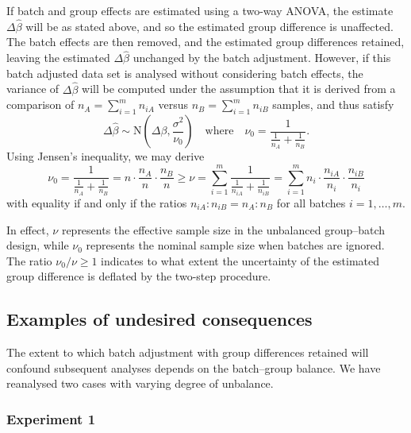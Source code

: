 \documentclass[oupdraft]{bio}
\begin{document}
If batch and group effects are estimated using a two-way ANOVA, the estimate $\Delta\hat{\beta}$ will be as stated above, and so the estimated group difference is unaffected. The batch effects are then removed, and the estimated group differences retained, leaving the estimated $\Delta\hat{\beta}$ unchanged by the batch adjustment. However, if this batch adjusted data set is analysed without considering batch effects, the variance of $\Delta\hat{\beta}$ will be computed under the assumption that it is derived from a comparison of $n_A=\sum_{i=1}^m n_{iA}$ versus $n_B=\sum_{i=1}^m n_{iB}$ samples, and thus satisfy
\begin{equation}
\Delta\hat{\beta}
\sim\text{N}\left(\Delta\beta,\frac{\sigma^2}{\nu_0}\right)
\quad\text{where}\quad
\nu_0=\frac{1}{\frac{1}{n_A}+\frac{1}{n_B}}.
\end{equation}
Using Jensen's inequality, we may derive
\begin{equation}
\nu_0
=\frac{1}{\frac{1}{n_A}+\frac{1}{n_B}}=n\cdot\frac{n_A}{n}\cdot\frac{n_B}{n}
\ge
\nu
=\sum_{i=1}^m \frac{1}{\frac{1}{n_{iA}}+\frac{1}{n_{iB}}}
=\sum_{i=1}^m n_i\cdot\frac{n_{iA}}{n_i}\cdot\frac{n_{iB}}{n_i}
\end{equation}
with equality if and only if the ratios $n_{iA}:n_{iB}=n_A:n_B$ for all batches $i=1,\ldots,m$.

In effect, $\nu$ represents the effective sample size in the unbalanced group--batch design, while $\nu_0$ represents the nominal sample size when batches are ignored. The ratio $\nu_0/\nu\ge1$ indicates to what extent the uncertainty of the estimated group difference is deflated by the two-step procedure.


\subsection{Examples of undesired consequences}

The extent to which batch adjustment with group differences retained will confound subsequent analyses depends on the batch--group balance. We have reanalysed two cases with varying degree of unbalance.

\subsubsection{Experiment 1}
\end{document}
